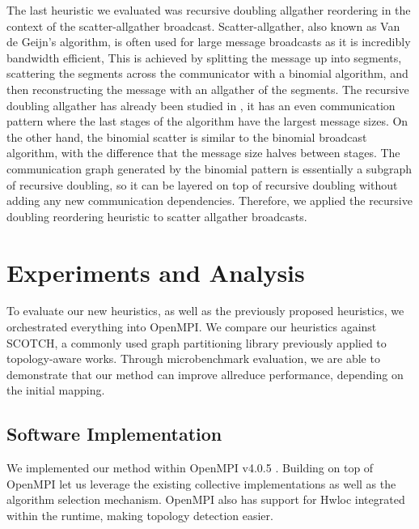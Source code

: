 The last heuristic we evaluated was recursive doubling allgather reordering in the context of the scatter-allgather broadcast.
Scatter-allgather, also known as Van de Geijn's algorithm, is often used for large message broadcasts as it is incredibly bandwidth efficient, 
This is achieved by splitting the message up into segments, scattering the segments across the communicator with a binomial algorithm, and then reconstructing the message with an allgather of the segments.
The recursive doubling allgather has already been studied in \cite{Mirsadeghi2016TopoAwareCollRR}, it has an even communication pattern where the last stages of the algorithm have the largest message sizes.
On the other hand, the binomial scatter is similar to the binomial broadcast algorithm, with the difference that the message size halves between stages. 
The communication graph generated by the binomial pattern is essentially a subgraph of recursive doubling, so it can be layered on top of recursive doubling without adding any new communication dependencies. 
Therefore, we applied the recursive doubling reordering heuristic to scatter allgather broadcasts.

\section{Experiments and Analysis}
To evaluate our new heuristics, as well as the previously proposed heuristics, we orchestrated everything into OpenMPI.
We compare our heuristics against SCOTCH, a commonly used graph partitioning library previously applied to topology-aware works.
Through microbenchmark evaluation, we are able to demonstrate that our method can improve allreduce performance, depending on the initial mapping.

\subsection{Software Implementation}
We implemented our method within OpenMPI v4.0.5 \cite{gabriel2004OpenMPI}.
Building on top of OpenMPI let us leverage the existing collective implementations as well as the algorithm selection mechanism.
OpenMPI also has support for Hwloc integrated within the runtime, making topology detection easier.

